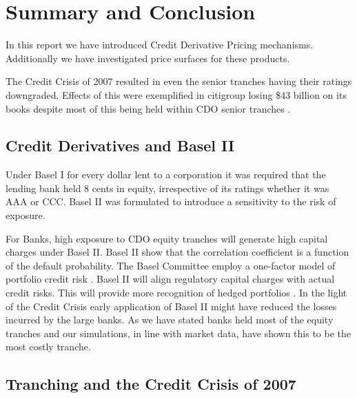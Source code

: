 \chapter{Summary and Conclusion}\label{chap:conclusion}

In this report we have introduced Credit Derivative Pricing mechanisms. 
Additionally we have investigated price surfaces for these products.

The Credit Crisis of 2007 resulted in even the senior tranches having their ratings
downgraded.  Effects of this were exemplified in citigroup losing \$43 billion on its
books despite most of this being held within CDO senior tranches \cite{econ2008cracks}.


\section{Credit Derivatives and Basel II}\label{sec:conc_baselII}

Under Basel I for every dollar lent to a corporation it was required that the lending bank held 8 cents in equity, irrespective of its ratings whether it was AAA or CCC.  Basel II was formulated to introduce a sensitivity to the risk of exposure.

For Banks, high exposure to CDO equity tranches will generate high capital charges under Basel II.  Basel II show that the correlation coefficient is a function of the default probability. The Basel Committee employ a one-factor model of portfolio credit risk \cite{lp2007}. Basel II will align regulatory capital charges with actual credit risks. This will provide more recognition of hedged portfolios \cite{Gib2007}. In the light of the Credit Crisis early application of Basel II might have reduced the losses incurred by the large banks.  As we have stated banks held most of the equity tranches and our simulations, in line with market data, have shown this to be the most costly tranche.

\section{Tranching and the Credit Crisis of 2007}\label{sec:conc_crisis}

